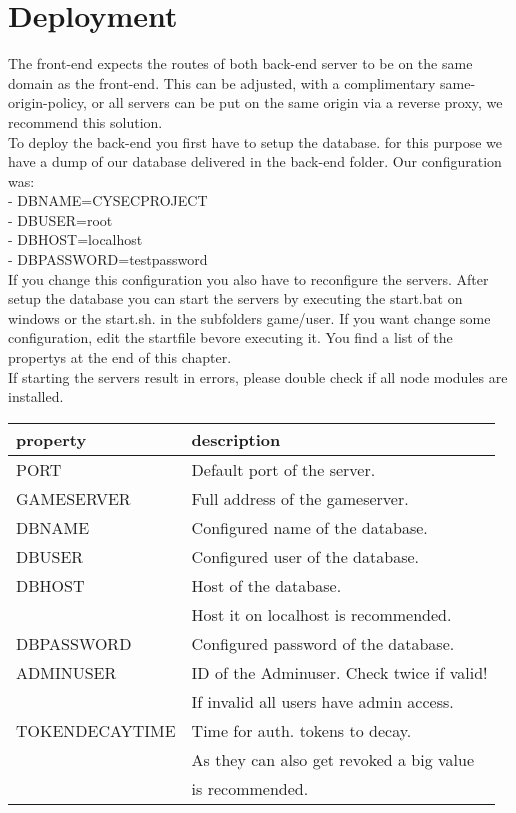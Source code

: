 \chapter{Deployment}
The front-end expects the routes of both back-end server to be on the same domain as the front-end. This can be adjusted, with a complimentary same-origin-policy, or all servers can be put on the same origin via a reverse proxy, we recommend this solution. \\

To deploy the back-end you first have to setup the database. for this purpose we have a dump of our database delivered in the back-end folder. Our configuration was:\\
- DBNAME=CYSECPROJECT\\
- DBUSER=root\\
- DBHOST=localhost\\
- DBPASSWORD=testpassword\\
If you change this configuration you also have to reconfigure the servers.
After setup the database you can start the servers by executing the start.bat on windows or the start.sh. in the subfolders game/user.
If you want change some configuration, edit the startfile bevore executing it. You find a list of the propertys at the end of this chapter.\\
If starting the servers result in errors, please double check if all node modules are installed.

\begin{tabular}{| l | l |}
    \hline
    property & description \\ \hline
    PORT & Default port of the server. \\ \hline
    GAMESERVER & Full address of the gameserver. \\ \hline
    DBNAME & Configured name of the database. \\ \hline
    DBUSER & Configured user of the database. \\ \hline
    DBHOST & Host of the database.\hline\\
    & Host it on localhost is recommended. \\ \hline
    DBPASSWORD & Configured password of the database. \\ \hline
    ADMINUSER & ID of the Adminuser. Check twice if valid! \\
    & If invalid all users have admin access. \\ \hline
    TOKENDECAYTIME & Time for auth. tokens to decay.\\
    & As they can also get revoked a big value \\
    & is recommended. \\ \hline
\end{tabular}

